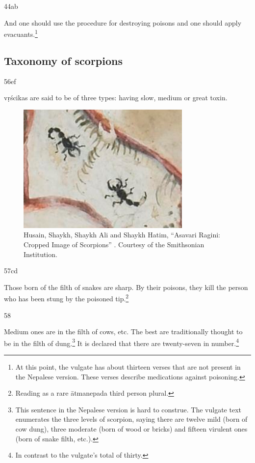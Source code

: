 \begin{translation}
\item[44ab]

And one should use the procedure for destroying poisons and one should apply 
evacuants.\footnote{At this point, the vulgate has about thirteen verses that 
are not present in the Nepalese version.  These verses describe medications against 
poisoning.}


 
\subsection{Taxonomy of scorpions}

\item[56ef]

\Glspl{vṛścika} are said to be of three types: having slow, medium or great toxin.
 
 \begin{figure}
     \centering
     \includegraphics[width=0.7\linewidth]{"media/Scorpions Smithsonian"}
     \caption{Husain, Shaykh, Shaykh Ali and Shaykh Hatim, “Asavari Ragini: 
     Cropped Image of Scorpions” \citep{husa-1591}. Courtesy of the Smithsonian 
     Institution.}
     \label{fig:scorpions-smithsonian}
 \end{figure}
 
 \item[57cd]
 
 Those born of the filth of snakes are sharp.  By their poisons, they kill the person 
 who has been stung by the poisoned tip.\footnote{Reading  as a rare 
 ātmanepada third person plural.}
 
 \item[58]
 
 
 Medium ones are in the filth of cows, etc. The best are traditionally 
 thought to be in the filth of dung.\footnote{This sentence in the Nepalese version 
 is hard to construe.  The vulgate text enumerates the three levels of scorpion, 
 saying there are twelve mild (born of cow dung), three moderate (born of wood or 
 bricks) and fifteen virulent ones (born of snake filth, etc.).}
     It is declared that there are twenty-seven in number.\footnote{In contrast to the 
     vulgate's total of thirty.} 
         

\end{translation}
